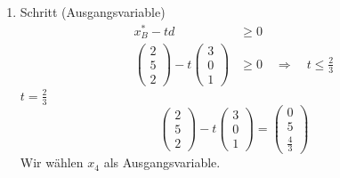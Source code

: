 \documentclass[a4paper]{scrartcl}
\begin{document}
\begin{enumerate}[label=\bfseries\arabic*.]
\begin{enumerate}
\begin{enumerate}[1.]
\begin{enumerate}[1.]
                            \item Schritt (Ausgangsvariable)
                                \begin{equation}
                                    \begin{split}
                                        x_B^* - td &\geq 0 \\
                                        \begin{pmatrix}
                                            2 \\ 5 \\ 2
                                        \end{pmatrix}
                                        - t
                                        \begin{pmatrix}
                                            3 \\ 0 \\ 1
                                        \end{pmatrix}
                                        &\geq 0
                                        \quad\Rightarrow\quad
                                        t \leq \frac{2}{3}
                                    \end{split}
                                \end{equation}
                                $t = \frac{2}{3}$
                                \begin{equation}
                                    \begin{pmatrix}
                                        2 \\ 5 \\ 2
                                    \end{pmatrix}
                                    - t
                                    \begin{pmatrix}
                                        3 \\ 0 \\ 1
                                    \end{pmatrix}
                                    =
                                    \begin{pmatrix}
                                        0 \\ 5 \\ \frac{4}{3}
                                    \end{pmatrix}
                                \end{equation}
                                Wir wählen $x_4$ als Ausgangsvariable.


\end{enumerate}
\end{enumerate}
\end{enumerate}
\end{enumerate}
\end{document}
